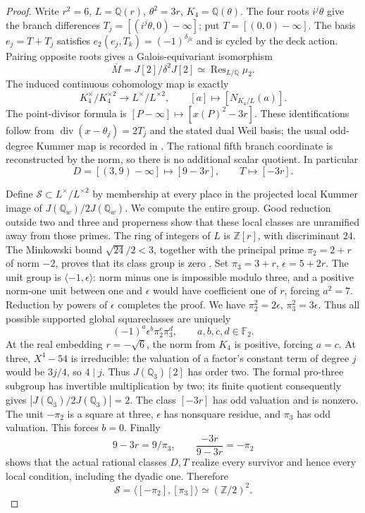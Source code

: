 \begin{proof}
Write \(r^2=6\), \(L=\mathbb Q(r)\),
\(\theta^2=3r\), \(K_4=\mathbb Q(\theta)\). The four roots
\(i^j\theta\) give the branch differences
\(T_j=[(i^j\theta,0)-\infty]\); put
\(T=[(0,0)-\infty]\). The basis \(e_j=T+T_j\) satisfies
\(e_2(e_j,T_k)=(-1)^{\delta_{jk}}\) and is cycled by the deck
action. Pairing opposite roots gives a Galois-equivariant
isomorphism
\[
 \overline M=J[2]/\delta^2J[2]
    \simeq\operatorname{Res}_{L/\mathbb Q}\mu_2.
\]
The induced continuous cohomology map is exactly
\[
 K_4^\times/K_4^{\times2}
     \longrightarrow L^\times/L^{\times2},
       \qquad[a]\longmapsto[N_{K_4/L}(a)].
\]
The point-divisor formula is
\([P-\infty]\mapsto[x(P)^2-3r]\). These identifications
follow from \(\operatorname{div}(x-\theta_j)=2T_j\) and
the stated dual Weil basis; the usual odd-degree Kummer map is
recorded in \cite[\S4]{GhostGross2012}. The rational fifth branch
coordinate is reconstructed by the norm, so there is no additional
scalar quotient. In particular
\[
 D=[(3,9)-\infty]\longmapsto[9-3r],\qquad
 T\longmapsto[-3r].
\]

Define \(\mathcal S\subset L^\times/L^{\times2}\) by
membership at every place in the projected local Kummer image of
\(J(\mathbb Q_w)/2J(\mathbb Q_w)\). We compute the entire
group. Good reduction outside two and three and properness show
that these local classes are unramified away from those primes.
The ring of integers of \(L\) is \(\mathbb Z[r]\), with
discriminant \(24\). The Minkowski bound
\(\sqrt{24}/2<3\), together with the principal prime
\(\pi_2=2+r\) of norm \(-2\), proves that its class group
is zero \cite[Theorem 4.3]{GhostMilneANT}. Set
\(\pi_3=3+r\), \(\epsilon=5+2r\). The unit group is
\(\langle-1,\epsilon\rangle\): norm minus one is impossible
modulo three, and a positive norm-one unit between one and
\(\epsilon\) would have coefficient one of \(r\), forcing
\(a^2=7\). Reduction by powers of \(\epsilon\) completes
the proof. We have
\(\pi_2^2=2\epsilon\), \(\pi_3^2=3\epsilon\).
Thus all possible supported global squareclasses are uniquely
\[
         (-1)^a\epsilon^b\pi_2^c\pi_3^d,
               \qquad a,b,c,d\in\mathbb F_2.
\]
At the real embedding \(r=-\sqrt6\), the norm from \(K_4\)
is positive, forcing \(a=c\). At three, \(X^4-54\) is
irreducible: the valuation of a factor's constant term of degree
\(j\) would be \(3j/4\), so \(4\mid j\). Thus
\(J(\mathbb Q_3)[2]\) has order two. The formal pro-three
subgroup has invertible multiplication by two; its finite
quotient consequently gives
\(|J(\mathbb Q_3)/2J(\mathbb Q_3)|=2\). The class
\([-3r]\) has odd valuation and is nonzero. The unit
\(-\pi_2\) is a square at three, \(\epsilon\) has nonsquare
residue, and \(\pi_3\) has odd valuation. This forces \(b=0\).
Finally
\[
       9-3r=9/\pi_3,\qquad
       \frac{-3r}{9-3r}=-\pi_2
\]
shows that the actual rational classes \(D,T\) realize every
survivor and hence every local condition, including the dyadic
one. Therefore
\[
              \mathcal S=\langle[-\pi_2],[\pi_3]\rangle
                    \simeq(\mathbb Z/2)^2.
\]


\end{proof}
